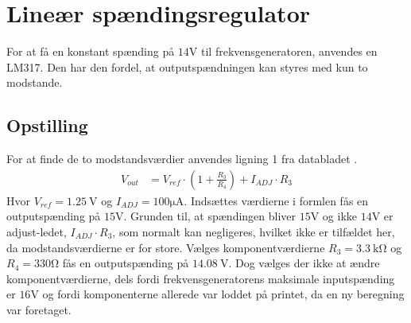 \section{Lineær spændingsregulator}\label{sec:lm317}
For at få en konstant spænding på $14\si{\volt}$ til frekvensgeneratoren, anvendes en LM317. Den har den fordel, at outputspændningen kan styres med kun to modstande.
\subsection{Opstilling}
For at finde de to modstandsværdier anvendes ligning 1 fra databladet \cite[Side. 10]{LM317}.
\begin{align}
	V_{out} & = V_{ref} \cdot \left( 1 + \frac{R_3}{R_4} \right) + I_{ADJ} \cdot R_3 \label{eq:lm317_formel}
\end{align}
Hvor $V_{ref} = \SI{1.25}{\volt}$ og $I_{ADJ} = 100\si{\micro\ampere}$. Indsættes værdierne i formlen fås en outputspænding på $15\si{\volt}$. Grunden til, at spændingen bliver $15\si{\volt}$ og ikke $14\si{\volt}$ er adjust-ledet, $I_{ADJ} \cdot R_3$, som normalt kan negligeres, hvilket ikke er tilfældet her, da modstandsværdierne er for store. Vælges komponentværdierne $R_3 = \SI{3.3}{\kilo\ohm}$ og $R_4 = 330\si{\ohm}$ fås en outputspænding på $\SI{14.08}{\volt}$. Dog vælges der ikke at ændre komponentværdierne, dels fordi frekvensgeneratorens maksimale inputspænding er $16\si{\volt}$ og fordi komponenterne allerede var loddet på printet, da en ny beregning var foretaget.